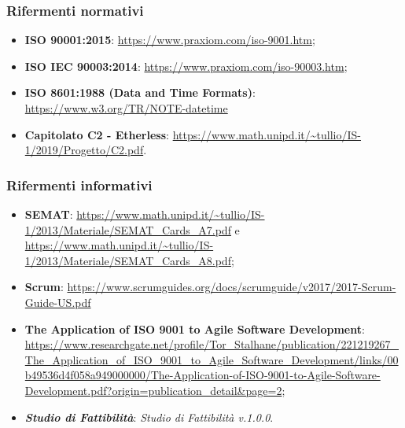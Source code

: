 \subsubsection{Rifermenti normativi}
\begin{itemize}
  \item \textbf{ISO 90001:2015}: \url{https://www.praxiom.com/iso-9001.htm};
  \item \textbf{ISO IEC 90003:2014}:  \url{https://www.praxiom.com/iso-90003.htm};
  \item \textbf{ISO 8601:1988 (Data and Time Formats)}: \url {https://www.w3.org/TR/NOTE-datetime} 
  \item \textbf{Capitolato C2 - Etherless}: \url{https://www.math.unipd.it/~tullio/IS-1/2019/Progetto/C2.pdf}.
\end{itemize}

\subsubsection{Rifermenti informativi}
\begin{itemize}
  \item \textbf{SEMAT}: \url{https://www.math.unipd.it/~tullio/IS-1/2013/Materiale/SEMAT_Cards_A7.pdf} e
  \url{https://www.math.unipd.it/~tullio/IS-1/2013/Materiale/SEMAT_Cards_A8.pdf};
  \item \textbf{Scrum}: \url{https://www.scrumguides.org/docs/scrumguide/v2017/2017-Scrum-Guide-US.pdf}
  \item \textbf{The Application of ISO 9001 to Agile Software Development}: \url{https://www.researchgate.net/profile/Tor_Stalhane/publication/221219267_The_Application_of_ISO_9001_to_Agile_Software_Development/links/00b49536d4f058a949000000/The-Application-of-ISO-9001-to-Agile-Software-Development.pdf?origin=publication_detail&page=2};
  \item \textbf{\textit{Studio di Fattibilità\docs}}: \textit{Studio di Fattibilità v.1.0.0}.

\end{itemize}

